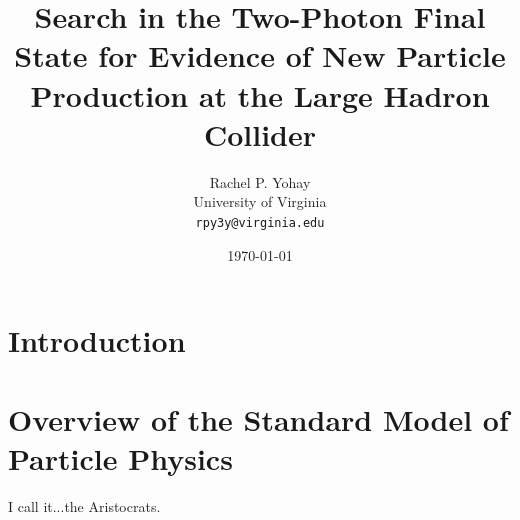 \documentclass[12pt, letterpaper]{report}
\begin{document}
\title{Search in the Two-Photon Final State for Evidence of New Particle Production at the Large Hadron Collider}
\author{Rachel P. Yohay \\
	University of Virginia \\
	\texttt{rpy3y@virginia.edu}}
\date{\today}
\maketitle

\tableofcontents

\chapter{Introduction}

\chapter{Overview of the Standard Model of Particle Physics}

I call it...the Aristocrats.



\end{document}
